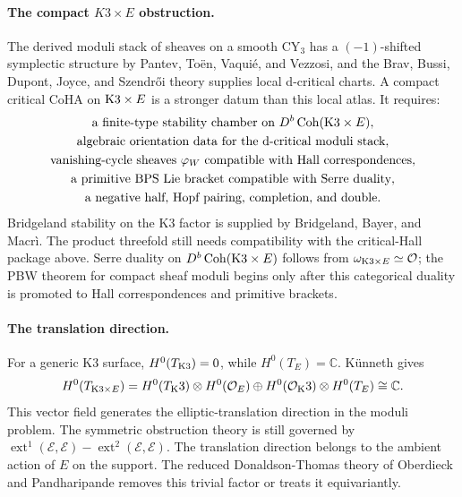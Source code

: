 \paragraph{The compact $K3\times E$ obstruction.}
The derived moduli stack of sheaves on a smooth CY$_3$ has a
$(-1)$-shifted symplectic structure by Pantev, To\"en, Vaqui\'e, and
Vezzosi, and the Brav, Bussi, Dupont, Joyce, and Szendr\H{o}i theory
supplies local d-critical charts. A compact critical CoHA on
$\mathrm{K}3\times E$ is a stronger datum than this local atlas. It requires:
\[
\begin{gathered}
\text{a finite-type stability chamber on }D^b\operatorname{Coh}(\mathrm{K}3\times E),\\
\text{algebraic orientation data for the d-critical moduli stack},\\
\text{vanishing-cycle sheaves }\varphi_W\text{ compatible with Hall correspondences},\\
\text{a primitive BPS Lie bracket compatible with Serre duality},\\
\text{a negative half, Hopf pairing, completion, and double.}
\end{gathered}
\]
Bridgeland stability on the K3 factor is supplied by Bridgeland, Bayer,
and Macr\`i. The product threefold still needs compatibility with
the critical-Hall package above. Serre duality on $D^b\operatorname{Coh}(\mathrm{K}3\times E)$
follows from $\omega_{\mathrm{K}3\times E}\simeq\mathcal{O}$; the PBW theorem for compact
sheaf moduli begins only after this categorical duality is promoted to
Hall correspondences and primitive brackets.

\paragraph{The translation direction.}
For a generic K3 surface, $H^0(T_{\mathrm{K}3})=0$, while
$H^0(T_E)=\mathbb{C}$. K\"unneth gives
\[
H^0(T_{\mathrm{K}3\times E})
 =
H^0(T_\mathrm{K}3)\otimes H^0(\mathcal{O}_E)
\oplus
H^0(\mathcal{O}_\mathrm{K}3)\otimes H^0(T_E)
\cong \mathbb{C}.
\]
This vector field generates the elliptic-translation direction in the
moduli problem. The symmetric obstruction theory is still governed by
$\operatorname{ext}^1(\mathcal E,\mathcal E)-
\operatorname{ext}^2(\mathcal E,\mathcal E)$. The translation direction
belongs to the ambient action of $E$ on the support. The reduced
Donaldson-Thomas theory of Oberdieck and Pandharipande removes this
trivial factor or treats it equivariantly.

